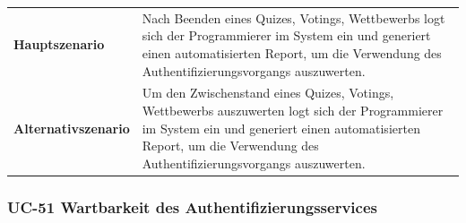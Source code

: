 \begin{longtable}[c]{@{}ll@{}}
\begin{minipage}[t]{0.34\columnwidth}\raggedright\strut
\textbf{Hauptszenario}
\strut\end{minipage} &
\begin{minipage}[t]{0.60\columnwidth}\raggedright\strut
Nach Beenden eines Quizes, Votings, Wettbewerbs logt sich der
Programmierer im System ein und generiert einen automatisierten Report,
um die Verwendung des Authentifizierungsvorgangs auszuwerten.
\strut\end{minipage}\tabularnewline
\begin{minipage}[t]{0.34\columnwidth}\raggedright\strut
\textbf{Alternativszenario}
\strut\end{minipage} &
\begin{minipage}[t]{0.60\columnwidth}\raggedright\strut
Um den Zwischenstand eines Quizes, Votings, Wettbewerbs auszuwerten logt
sich der Programmierer im System ein und generiert einen automatisierten
Report, um die Verwendung des Authentifizierungsvorgangs auszuwerten.
\strut\end{minipage}\tabularnewline
\bottomrule
\end{longtable}

\subsubsection{UC-51 Wartbarkeit des
Authentifizierungsservices}\label{uc-51-wartbarkeit-des-authentifizierungsservices}

